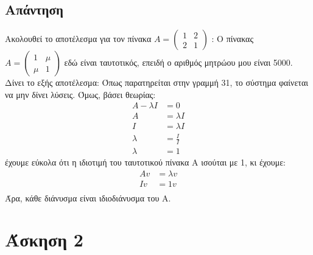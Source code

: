 \documentclass[a4paper,12pt]{article}
\begin{document}
\subsection{Απάντηση}
Ακολουθεί το αποτέλεσμα για τον πίνακα
$
	A=\begin{pmatrix}
		1 & 2 \\
		2 & 1
	\end{pmatrix}
$
:
%
Ο πίνακας
$
	A=\begin{pmatrix}
		1   & \mu \\
		\mu & 1
	\end{pmatrix}
$
εδώ είναι ταυτοτικός, επειδή ο αριθμός μητρώου μου είναι 5000. Δίνει το εξής αποτέλεσμα:
%
Όπως παρατηρείται στην γραμμή 31, το σύστημα φαίνεται να μην δίνει λύσεις. Όμως, βάσει θεωρίας:
\begin{equation}
	\begin{split}
		A - \lambda I &= 0 \\
		A &= \lambda I \\
		I &= \lambda I \\
		\lambda & =\frac{I}{I} \\
		\lambda & =1
	\end{split}
\end{equation}
έχουμε εύκολα ότι η ιδιοτιμή του ταυτοτικού  πίνακα Α ισούται με 1, κι έχουμε:
\begin{equation}
	\begin{split}
		A v &= \lambda v \\
		I v&= 1 v \\
	\end{split}
\end{equation}
Άρα, κάθε διάνυσμα είναι ιδιοδιάνυσμα του Α.
\newpage\section{Άσκηση 2}
\end{document}
